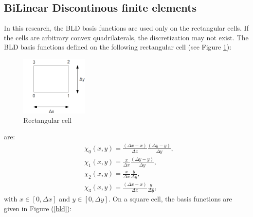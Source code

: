 \subsection{BiLinear Discontinous finite elements}
In this research, the BLD basis functions are used only on the rectangular
cells. If the cells are arbitrary convex quadrilaterals, the discretization may
not exist. The BLD basis functions defined on the following rectangular cell
(see Figure \ref{fig_cell}):
\begin{figure}[H]
  \centering
  \includegraphics[width=0.3\textwidth]{./Spatial_discretizations/cell}
  \caption{Rectangular cell}
  \label{fig_cell}
\end{figure}
are:
\begin{align}
  &\chi_0(x,y) = \frac{(\Delta x-x)}{\Delta x}\frac{(\Delta y-y)}{\Delta y},\\
  &\chi_1(x,y) = \frac{x}{\Delta x}\frac{(\Delta y-y)}{\Delta y},\\
  &\chi_2(x,y) = \frac{x}{\Delta x}\frac{y}{\Delta y},\\
  &\chi_3(x,y) = \frac{(\Delta x-x)}{\Delta x}\frac{y}{\Delta y},
\end{align}
with $x\in[0,\Delta x]$ and $y\in[0,\Delta y]$. On a square cell, the basis 
functions are given in Figure (\ref{bld}):
